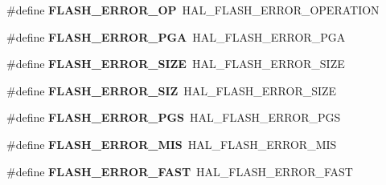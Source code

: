 \begin{DoxyCompactItemize}
\mbox{\label{group___h_a_l___f_l_a_s_h___aliased___defines_ga7e6bf51847569d433bdb694bdb5ac0f7}} 
\#define {\bfseries F\+L\+A\+S\+H\+\_\+\+E\+R\+R\+O\+R\+\_\+\+OP}~H\+A\+L\+\_\+\+F\+L\+A\+S\+H\+\_\+\+E\+R\+R\+O\+R\+\_\+\+O\+P\+E\+R\+A\+T\+I\+ON
\item 
\mbox{\label{group___h_a_l___f_l_a_s_h___aliased___defines_ga3e610cf7bc499ea0e7eee1380a04f42d}} 
\#define {\bfseries F\+L\+A\+S\+H\+\_\+\+E\+R\+R\+O\+R\+\_\+\+P\+GA}~H\+A\+L\+\_\+\+F\+L\+A\+S\+H\+\_\+\+E\+R\+R\+O\+R\+\_\+\+P\+GA
\item 
\mbox{\label{group___h_a_l___f_l_a_s_h___aliased___defines_gac056ad0617d3beaf8cf2ffb0c87b7266}} 
\#define {\bfseries F\+L\+A\+S\+H\+\_\+\+E\+R\+R\+O\+R\+\_\+\+S\+I\+ZE}~H\+A\+L\+\_\+\+F\+L\+A\+S\+H\+\_\+\+E\+R\+R\+O\+R\+\_\+\+S\+I\+ZE
\item 
\mbox{\label{group___h_a_l___f_l_a_s_h___aliased___defines_gaaa959c347779d59952fcb60d15dbe2b0}} 
\#define {\bfseries F\+L\+A\+S\+H\+\_\+\+E\+R\+R\+O\+R\+\_\+\+S\+IZ}~H\+A\+L\+\_\+\+F\+L\+A\+S\+H\+\_\+\+E\+R\+R\+O\+R\+\_\+\+S\+I\+ZE
\item 
\mbox{\label{group___h_a_l___f_l_a_s_h___aliased___defines_ga578b6dd558f1d11d9791b3c63a61e14b}} 
\#define {\bfseries F\+L\+A\+S\+H\+\_\+\+E\+R\+R\+O\+R\+\_\+\+P\+GS}~H\+A\+L\+\_\+\+F\+L\+A\+S\+H\+\_\+\+E\+R\+R\+O\+R\+\_\+\+P\+GS
\item 
\mbox{\label{group___h_a_l___f_l_a_s_h___aliased___defines_ga10229d78c25e0d944031910606462be1}} 
\#define {\bfseries F\+L\+A\+S\+H\+\_\+\+E\+R\+R\+O\+R\+\_\+\+M\+IS}~H\+A\+L\+\_\+\+F\+L\+A\+S\+H\+\_\+\+E\+R\+R\+O\+R\+\_\+\+M\+IS
\item 
\mbox{\label{group___h_a_l___f_l_a_s_h___aliased___defines_gad20c28b002e14116facba21f02b0d1ba}} 
\#define {\bfseries F\+L\+A\+S\+H\+\_\+\+E\+R\+R\+O\+R\+\_\+\+F\+A\+ST}~H\+A\+L\+\_\+\+F\+L\+A\+S\+H\+\_\+\+E\+R\+R\+O\+R\+\_\+\+F\+A\+ST
\item 

\end{DoxyCompactItemize}
